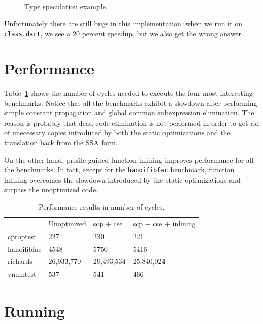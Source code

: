 \documentclass[10pt,twocolumn]{article}
\begin{document}
\begin{figure}
\begin{center}
\begin{minipage}{0.95\columnwidth}
  \caption{\label{fig:hammock} Type speculation example.}
\end{minipage}
\end{center}
\end{figure}

Unfortunately there are still bugs in this implementation: when we run
it on \texttt{class.dart}, we see a 20 percent speedup, but we also get the
wrong answer.

\section{Performance}

Table~\ref{results} shows the number of cycles needed to execute the four
most interesting benchmarks. Notice that all the benchmarks exhibit a slowdown
after performing simple constant propagation and global common subexpression elimination.
The reason is probably that dead code elimination is not performed in order
to get rid of unecessary copies introduced by both the static optimizations and the translation
back from the SSA form.

On the other hand, profile-guided function inlining improves performance for all the benchmarks.
In fact, except for the \texttt{hanoifibfac} benchmark, function inlining overcomes the slowdown
introduced by the static optimizations and surpass the unoptimized code.

\begin{table}
\begin{tabular}{llll}
~           & Unoptmized & scp + cse  & scp + cse + inlining \\
cproptest   & 227        & 230        & 221                  \\
hanoifibfac & 4548       & 5750       & 5416                 \\
richards    & 26,933,770 & 29,493,534 & 25,840,024           \\
vnumtest    & 537        & 541        & 466                  \\
\end{tabular}
\caption{Performance results in number of cycles.}
\label{results}
\end{table}


\section{Running}
\end{document}
